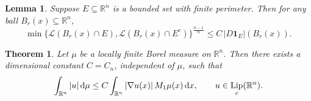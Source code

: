 \documentclass[10pt,a4paper]{amsart}
\newtheorem{theorem}{Theorem}
\newtheorem{lemma}{Lemma}
\DeclareMathOperator{\Lip}{\textup{Lip}}
\newcommand{\R}{\mathbb R}
\begin{document}
\begin{lemma}\label{lowerbdiso}
Suppose $E\subseteq \R^n$ is a bounded set with finite perimeter. Then for any ball $B_r(x)\subseteq \R^n$,
\begin{equation}\label{iso}
\min\{\mathcal L(B_r(x)\cap E),\mathcal L(B_r(x)\cap E^c)\}^{\frac{n-1}{n}}
\le C\,|D\mathbf 1_E|(B_r(x)).
\end{equation}
\end{lemma}

\begin{theorem}\label{Gradient}
Let $\mu$ be a locally finite Borel measure on $\R^n$. Then there exists a dimensional constant $C=C_n$, independent of $\mu$, such that
\begin{equation}\label{newMZthm}
\int_{\R^n} |u| \, \mathrm{d}\mu
\leq
C \int_{\R^n} |\nabla u(x)| \, \textup{M}_1 \mu(x)\, \mathrm{d}x,
\qquad
u \in \Lip_c(\R^n).
\end{equation}
\end{theorem}
\end{document}
